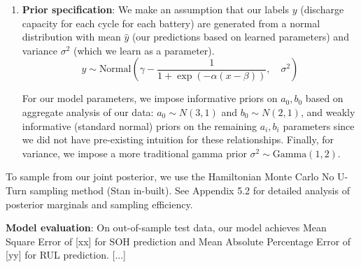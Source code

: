 \documentclass{article}
\begin{document}
\begin{enumerate}
    \item \textbf{Prior specification}: We make an assumption that our labels $y$ (discharge capacity for each cycle for each battery) are generated from a normal distribution with mean $\hat{y}$ (our predictions based on learned parameters) and variance $\sigma^2$ (which we learn as a parameter).
    $$ y \sim \text{Normal}\left(\gamma - \frac{1}{1+\exp(-\alpha(x-\beta))}, \quad \sigma^2\right)$$

    For our model parameters, we impose informative priors on $a_0, b_0$ based on aggregate analysis of our data: $a_0 \sim N(3,1)$ and $b_0 \sim N(2,1)$, and weakly informative (standard normal) priors on the remaining $a_i, b_i$ parameters since we did not have pre-existing intuition for these relationships. Finally, for variance, we impose a more traditional gamma prior $\sigma^2 \sim \text{Gamma}(1, 2)$.

\end{enumerate}

To sample from our joint posterior, we use the Hamiltonian Monte Carlo No U-Turn sampling method (Stan in-built). See Appendix 5.2 for detailed analysis of posterior marginals and sampling efficiency.

\textbf{Model evaluation}: On out-of-sample test data, our model achieves Mean Square Error of [xx] for SOH prediction and Mean Absolute Percentage Error of [yy] for RUL prediction. [...]
\end{document}

